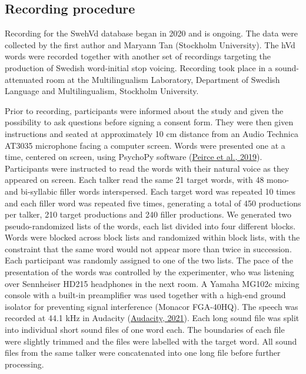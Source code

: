 \documentclass[utf8]{frontiersSCNS}
\begin{document}
\hypertarget{sec:vowelCorpRec}{%
\subsection*{Recording procedure}\label{sec:vowelCorpRec}}

Recording for the SwehVd database began in 2020 and is ongoing. The data were collected by the first author and Maryann Tan (Stockholm University). The hVd words were recorded together with another set of recordings targeting the production of Swedish word-initial stop voicing. Recording took place in a sound-attenuated room at the Multilingualism Laboratory, Department of Swedish Language and Multilingualism, Stockholm University.

Prior to recording, participants were informed about the study and given the possibility to ask questions before signing a consent form. They were then given instructions and seated at approximately 10 cm distance from an Audio Technica AT3035 microphone facing a computer screen. Words were presented one at a time, centered on screen, using PsychoPy software (\protect\hyperlink{ref-peirce2019}{Peirce et al., 2019}). Participants were instructed to read the words with their natural voice as they appeared on screen. Each talker read the same 21 target words, with 48 mono- and bi-syllabic filler words interspersed. Each target word was repeated 10 times and each filler word was repeated five times, generating a total of 450 productions per talker, 210 target productions and 240 filler productions. We generated two pseudo-randomized lists of the words, each list divided into four different blocks. Words were blocked across block lists and randomized within block lists, with the constraint that the same word would not appear more than twice in succession. Each participant was randomly assigned to one of the two lists. The pace of the presentation of the words was controlled by the experimenter, who was listening over Sennheiser HD215 headphones in the next room. A Yamaha MG102c mixing console with a built-in preamplifier was used together with a high-end ground isolator for preventing signal interference (Monacor FGA-40HQ). The speech was recorded at 44.1 kHz in Audacity (\protect\hyperlink{ref-teamaudacity2021}{Audacity, 2021}). Each long sound file was split into individual short sound files of one word each. The boundaries of each file were slightly trimmed and the files were labelled with the target word. All sound files from the same talker were concatenated into one long file before further processing.
\end{document}
